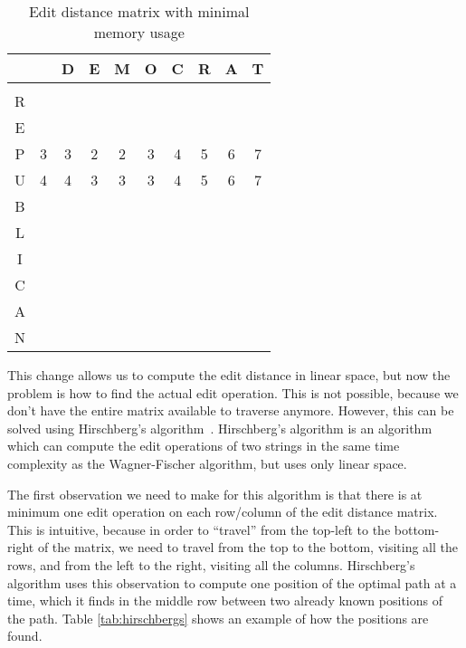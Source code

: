 \begin{table}
	\begin{center}
		\begin{tabular}[c]{c|c|c|c|c|c|c|c|c|c|}
			  &   & D & E & M & O & C & R & A & T \\\hline
			  &   &   &   &   &   &   &   &   &   \\\hline
			R &   &   &   &   &   &   &   &   &   \\\hline
			E &   &   &   &   &   &   &   &   &   \\\hline
			P & 3 & 3 & 2 & 2 & 3 & 4 & 5 & 6 & 7 \\\hline
			U & 4 & 4 & 3 & 3 & 3 & 4 & 5 & 6 & 7 \\\hline
			B &   &   &   &   &   &   &   &   &   \\\hline
			L &   &   &   &   &   &   &   &   &   \\\hline
			I &   &   &   &   &   &   &   &   &   \\\hline
			C &   &   &   &   &   &   &   &   &   \\\hline
			A &   &   &   &   &   &   &   &   &   \\\hline
			N &   &   &   &   &   &   &   &   &   \\\hline
		\end{tabular}
	\end{center}
	\caption{Edit distance matrix with minimal memory usage}
	\label{tab:minimalmemoryusageeditdistance}
\end{table}

This change allows us to compute the edit distance in linear space, but now the problem is
how to find the actual edit operation. This is not possible, because we don't have the
entire matrix available to traverse anymore. However, this can be solved using
Hirschberg's algorithm~\cite{HirschbergsAlgorithm}. Hirschberg's algorithm is an algorithm
which can compute the edit operations of two strings in the same time complexity as the
Wagner-Fischer algorithm, but uses only linear space.

The first observation we need to make for this algorithm is that there is at minimum one
edit operation on each row/column of the edit distance matrix. This is intuitive, because
in order to ``travel'' from the top-left to the bottom-right of the matrix, we need to
travel from the top to the bottom, visiting all the rows, and from the left to the right,
visiting all the columns. Hirschberg's algorithm uses this observation to compute one
position of the optimal path at a time, which it finds in the middle row between two
already known positions of the path. Table \ref{tab:hirschbergs} shows an example of how
the positions are found.

